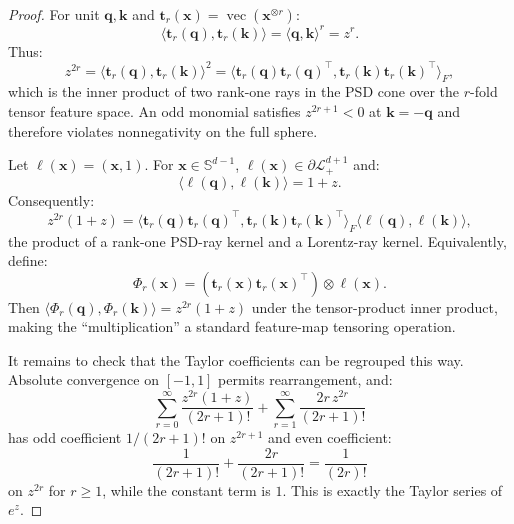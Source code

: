 \documentclass[10pt,a4paper]{amsart}
\def\gL{{\mathcal{L}}}
\newcommand{\lrangle}[1]{\langle#1\rangle}
\def\vk{{\bm{k}}}
\def\vq{{\bm{q}}}
\def\vt{{\bm{t}}}
\def\vx{{\bm{x}}}
\begin{document}
\begin{proof}

For unit $\vq,\vk$ and $\vt_r(\vx)=\operatorname{vec}(\vx^{\otimes r})$:
\[
  \lrangle{\vt_r(\vq),\vt_r(\vk)}
  = \lrangle{\vq,\vk}^r
  = z^r .
\]
Thus:
\[
  z^{2r}
  =
  \lrangle{\vt_r(\vq),\vt_r(\vk)}^2
  =
  \lrangle{\vt_r(\vq)\vt_r(\vq)^\top,
    \vt_r(\vk)\vt_r(\vk)^\top}_F,
\]
which is the inner product of two rank-one rays in the PSD cone over the $r$-fold tensor feature
space. An odd monomial satisfies $z^{2r+1}<0$ at $\vk=-\vq$ and therefore violates
nonnegativity on the full sphere.

Let $\ell(\vx)=(\vx,1)$. For $\vx\in\mathbb{S}^{d-1}$, $\ell(\vx)\in\partial\gL^{d+1}_{+}$ and:
\[
  \lrangle{\ell(\vq),\ell(\vk)} = 1+z.
\]
Consequently:
\[
  z^{2r}(1+z)
  =
  \lrangle{\vt_r(\vq)\vt_r(\vq)^\top,
    \vt_r(\vk)\vt_r(\vk)^\top}_F
  \lrangle{\ell(\vq),\ell(\vk)},
\]
the product of a rank-one PSD-ray kernel and a Lorentz-ray kernel. Equivalently, define:
\[
  \Phi_r(\vx)
  =
  \left(\vt_r(\vx)\vt_r(\vx)^\top\right)\otimes \ell(\vx).
\]
Then $\lrangle{\Phi_r(\vq),\Phi_r(\vk)}=z^{2r}(1+z)$ under the tensor-product inner product, making
the ``multiplication'' a standard feature-map tensoring operation.

It remains to check that the Taylor coefficients can be regrouped this way. Absolute convergence on
$[-1,1]$ permits rearrangement, and:
\[
  \sum_{r=0}^{\infty}\frac{z^{2r}(1+z)}{(2r+1)!}
  +
  \sum_{r=1}^{\infty}\frac{2r\,z^{2r}}{(2r+1)!}
\]
has odd coefficient $1/(2r+1)!$ on $z^{2r+1}$ and even coefficient:
\[
  \frac{1}{(2r+1)!}+\frac{2r}{(2r+1)!}
  = \frac{1}{(2r)!}
\]
on $z^{2r}$ for $r\ge1$, while the constant term is $1$. This is exactly the Taylor series of
$e^z$.

\end{proof}
\end{document}
